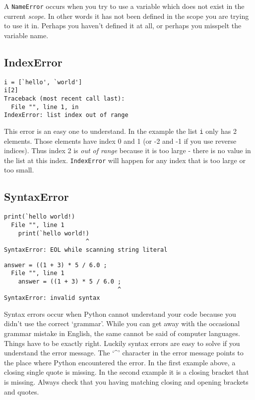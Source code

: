 A \texttt{NameError} occurs when you try to use a variable which does not exist in the current \textit{scope}. In other words                 it has not been defined in the scope you are trying to use it in. Perhaps you haven't defined it at all, or                 perhaps you misspelt the variable name.

\subsection{IndexError}

\begin{lstlisting}
i = [`hello', `world']
i[2]
Traceback (most recent call last):
  File "", line 1, in 
IndexError: list index out of range\end{lstlisting}

This error is an easy one to understand. In the example the list \texttt{i} only has 2 elements. Those elements                 have index 0 and 1 (or -2 and -1 if you use reverse indices). Thus index 2 is \textit{out of range} because it is too large - there is no value in the list at this index.                 \texttt{IndexError} will happen for any index that is too large or too small.

\subsection{SyntaxError}

\begin{lstlisting}
print(`hello world!)
  File "", line 1
    print(`hello world!)
                       ^
SyntaxError: EOL while scanning string literal
\end{lstlisting}
\begin{lstlisting}
answer = ((1 + 3) * 5 / 6.0 ;
  File "", line 1
    answer = ((1 + 3) * 5 / 6.0 ;
                                ^
SyntaxError: invalid syntax\end{lstlisting}

Syntax errors occur when Python cannot understand your code because you didn't use the correct `grammar'. While you can                 get away with the occasional grammar mistake in English, the same cannot be said of computer languages. Things have to be                 exactly right. Luckily syntax errors are easy to solve if you understand the error message. The `\textbf{\textasciicircum}' character in the error message                 points to the place where Python encountered the error. In the                 first example above, a closing single quote is missing. In the second example it is a closing bracket that is missing.                 Always check that you having matching closing and opening brackets and quotes.

